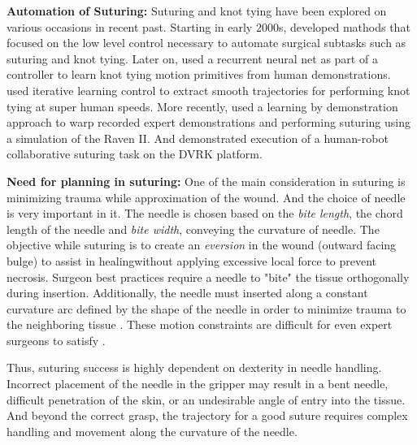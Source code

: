 \documentclass[0-suturing.tex]{subfiles}
\begin{document}
\vspace{3pt}
\noindent\textbf{Automation of Suturing: }
Suturing and knot tying have been explored on various occasions in recent past. Starting in early 2000s, \citet{Kang2000Autonomous} developed mathods that focused on the low level control necessary
to automate surgical subtasks such as suturing and knot tying.
Later on, \citet{Mayer2006System} used a recurrent neural net as part of a controller to learn knot tying motion primitives from human demonstrations.\citet{Berg2010Superhuman} used iterative learning control to extract smooth trajectories for performing knot tying at super human speeds. More recently, \citet{Schulman2013Case} used a learning by demonstration approach to warp recorded
expert demonstrations and performing suturing using a simulation of the Raven II. And \citet{Padoy2011} demonstrated execution of a human-robot collaborative suturing task on the DVRK platform. 

\vspace{3pt}
\noindent \textbf{Need for planning in suturing: }
One of the main consideration in suturing is minimizing trauma while approximation of the wound. And the choice of needle is very important in it. The needle is chosen based on the \textit{bite length}, the chord length of the needle and \textit{bite width}, conveying the curvature of needle. The objective while suturing is to create an \textit{eversion} in the wound (outward facing bulge) to assist in healing\tocite without applying excessive local force to prevent necrosis. Surgeon best practices require a needle to "bite" the tissue orthogonally during insertion. Additionally, the needle must inserted along a constant curvature arc defined by the shape of the needle in order to minimize trauma to the neighboring tissue \cite{Jackson2013Needle}. These motion constraints are difficult for even expert surgeons to satisfy \cite{Kang2000Autonomous}.

Thus, suturing success is highly dependent on dexterity in needle handling. Incorrect placement of the needle in the gripper may result in a bent needle, difficult penetration of the skin, or an undesirable angle of entry into the tissue. And beyond the correct grasp, the trajectory for a good suture requires complex handling and movement along the curvature of the needle.
\end{document}
